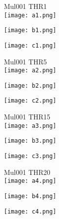 \documentclass[a4paper]{article}
\begin{document}
    \begin{figure}[tb]
    Mul001 THR1 \\
    \texttt{[image: a1.png]}
        \begin{minipage}{0.48\textwidth}
            \def\svgwidth{\columnwidth}
            \texttt{[image: b1.png]}
        \end{minipage}
        \hspace{4em}
        \begin{minipage}{0.48\textwidth}
            \def\svgwidth{\columnwidth}
            \texttt{[image: c1.png]}
        \end{minipage}
    \end{figure}
    \newpage
    \begin{figure}[tb]
    Mul001 THR5 \\
    \texttt{[image: a2.png]}
        \begin{minipage}{0.48\textwidth}
            \def\svgwidth{\columnwidth}
            \texttt{[image: b2.png]}
        \end{minipage}
        \hspace{4em}
        \begin{minipage}{0.48\textwidth}
            \def\svgwidth{\columnwidth}
            \texttt{[image: c2.png]}
        \end{minipage}
    \end{figure}
    \newpage
    
    \begin{figure}[tb]
        Mul001 THR15 \\
    \texttt{[image: a3.png]}
        \begin{minipage}{0.48\textwidth}
            \def\svgwidth{\columnwidth}
            \texttt{[image: b3.png]}
        \end{minipage}
        \hspace{4em}
        \begin{minipage}{0.48\textwidth}
            \def\svgwidth{\columnwidth}
            \texttt{[image: c3.png]}
        \end{minipage}
    \end{figure}
    \newpage
    \begin{figure}[tb]
    Mul001 THR20 \\
    \texttt{[image: a4.png]}
        \begin{minipage}{0.48\textwidth}
            \def\svgwidth{\columnwidth}
            \texttt{[image: b4.png]}
        \end{minipage}
        \hspace{4em}
        \begin{minipage}{0.48\textwidth}
            \def\svgwidth{\columnwidth}
            \texttt{[image: c4.png]}
        \end{minipage}
    \end{figure}
    \newpage
    
\end{document}
